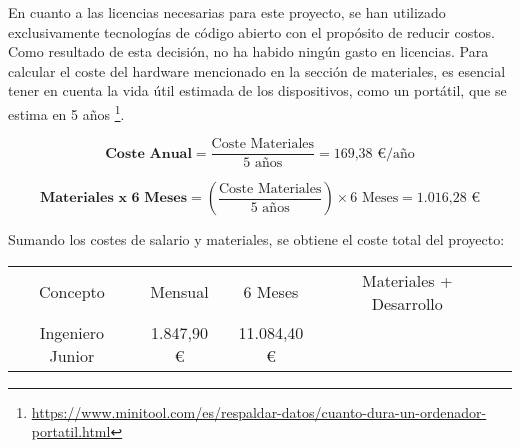 En cuanto a las licencias necesarias para este proyecto, se han utilizado exclusivamente tecnologías de código abierto con el propósito de reducir costos. Como resultado de esta decisión, no ha habido ningún gasto en licencias. Para calcular el coste del hardware mencionado en la sección de materiales, es esencial tener en cuenta la vida útil estimada de los dispositivos, como un portátil, que se estima en 5 años \footnote{\url{https://www.minitool.com/es/respaldar-datos/cuanto-dura-un-ordenador-portatil.html}}.

\begin{equation}
    \textbf{Coste Anual} = \frac {\text{Coste Materiales}}{\text{5 años}} = \text{169,38 €/año}
\end{equation}

\begin{equation}
    \textbf{Materiales x 6 Meses} = \left(\frac {\text{Coste Materiales}}{\text{5 años}}\right) \times 6 \text{ Meses} = \text{1.016,28 €}
\end{equation}

Sumando los costes de salario y materiales, se obtiene el coste total del proyecto:

\begin{table}[H]
    \begin{tabular}{|c|c|c|l|l}
    \cline{1-4}
    Concepto         & Mensual    & 6 Meses     & \multicolumn{1}{c|}{Materiales + Desarrollo} &  \\ \cline{1-4}
    Ingeniero Junior & 1.847,90 € & 11.084,40 € &                                              &  \\ \cline{1-4}
    \end{tabular}
\end{table}
